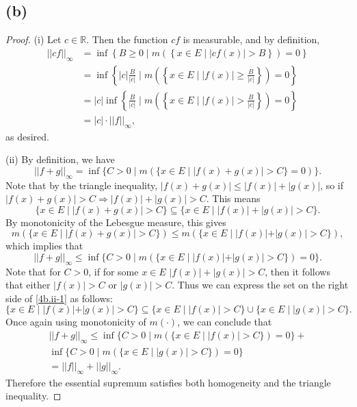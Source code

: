\documentclass{article}
\newcommand{\R}{\mathbb{R}} %
\begin{document}
\subsection*{(b)}
\begin{proof}
	(i) Let $c \in \R$. Then the function $cf$ is measurable, and by definition,
	\begin{align}
		||cf||_{\infty} &= \inf \left\{B \geq 0 \;\big|\; m\left(\left\{x \in E \;|\; |cf(x)| > B\right\}\right) = 0\right\} \\
		&= \inf\left\{|c|\frac{B}{|c|} \;\Big|\; m\left(\left\{x \in E \;|\; |f(x)| \geq \frac{B}{|c|}\right\}\right) = 0\right\} \\
		&= |c| \inf\left\{\frac{B}{|c|} \;\Big|\; m\left(\left\{x \in E \;|\; |f(x)| > \frac{B}{|c|}\right\}\right) = 0\right\} \\
		&= |c| \cdot ||f||_{\infty}, 
	\end{align}
	as desired.
	
	(ii) By definition, we have
	\begin{equation}
		||f + g||_{\infty} = \inf\{C > 0 \;|\; m(\{x \in E \;|\; |f(x) + g(x)| > C\} = 0)\}.
	\end{equation}
	Note that by the triangle inequality, $|f(x) + g(x)| \leq |f(x)| + |g(x)|$, so if \\$|f(x) + g(x)| > C \Rightarrow |f(x)| + |g(x)| > C$. This means
	\begin{equation}\label{4b.ii-1}
		\{x \in E \;|\; |f(x) + g(x)| > C \} \subseteq \{x \in E \;|\; |f(x)| + |g(x)| > C\}.
	\end{equation}
	By monotonicity of the Lebesgue measure, this gives
	\begin{equation}
		m(\{x \in E \;|\; |f(x) + g(x)| > C \}) \leq m(\{x \in E \;|\; |f(x)| + |g(x)| > C\}),
	\end{equation}
	which implies that
	\begin{equation}
		||f + g||_{\infty} \leq \inf\{C > 0 \;|\; m(\{x \in E \;|\; |f(x)| + |g(x)| > C\}) = 0\}.
	\end{equation}
	Note that for $C > 0$, if for some $x \in E$ $|f(x)| + |g(x)| > C$, then it follows that either $|f(x)| > C$ or $|g(x)| > C$. Thus we can express the set on the right side of \eqref{4b.ii-1} as follows:
	\begin{equation}
		\{x \in E \;|\; |f(x)| + |g(x)| > C\} \subseteq \{x \in E \;|\; |f(x)| > C\} \cup \{x \in E \;|\; |g(x)| > C\}.
	\end{equation}
	Once again using monotonicity of $m(\cdot)$, we can conclude that
	\begin{align}
		||f + g||_{\infty} \leq \inf\{C > 0 \;|\; m(\{x \in E \;|\; |f(x)| > C\})=0\} + \nonumber \\ \inf\{C > 0 \;|\; m(\{x \in E \;|\; |g(x)| > C\})=0\} \\
		= ||f||_{\infty} + ||g||_{\infty}.
	\end{align}
	Therefore the essential supremum satisfies both homogeneity and the triangle inequality.
\end{proof}
 
\end{document}

